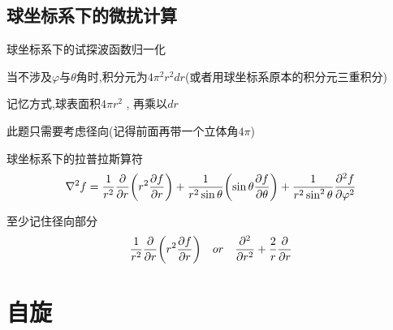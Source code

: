\documentclass{article}
\begin{document}
        \subsection{球坐标系下的微扰计算}
            \begin{formal}
                球坐标系下的试探波函数归一化

                当不涉及$\varphi$与$\theta$角时,积分元为$4\pi^{2} r ^{2} dr$(或者用球坐标系原本的积分元三重积分)
                
                记忆方式,球表面积$4\pi r^{2}$ , 再乘以$dr$
            \end{formal}

            此题只需要考虑径向(记得前面再带一个立体角$4\pi$)
            \begin{formal}
                球坐标系下的拉普拉斯算符
                $$ 
                \nabla^{2}f = \frac{1}{r^{2}} \pdv{r} \qty(r^{2} \pdv{f}{r} ) + 
                \frac{1}{r^{2} \sin{\theta}} \qty(\sin{\theta} \pdv{f}{\theta}) + 
                \frac{1}{r^{2} \sin^{2}{\theta}} \pdv[2]{f}{\varphi} 
                $$

                至少记住径向部分
                $$
                    \frac{1}{r^{2}} \pdv{r} (r^{2} \pdv{f}{r}) \quad or \quad \pdv[2]{r} + \frac{2}{r}\pdv{r}
                $$

            \end{formal}
            

        



















    \section{自旋}
\end{document}
